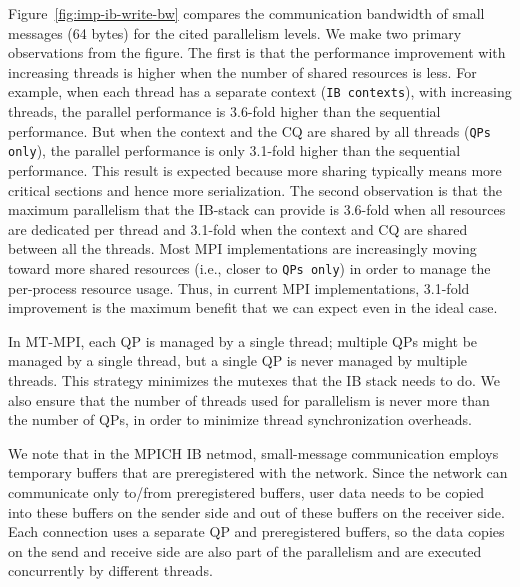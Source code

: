 Figure~\ref{fig:imp-ib-write-bw} compares the communication bandwidth
of small messages (64 bytes) for the cited parallelism levels.  We
make two primary observations from the figure.  The first is that the
performance improvement with increasing threads is higher when the
number of shared resources is less.  For example, when each thread has
a separate context (\texttt{IB contexts}), with increasing threads,
the parallel performance is 3.6-fold higher than the sequential
performance.  But when the context and the CQ are shared by all
threads (\texttt{QPs only}), the parallel performance is only 3.1-fold
higher than the sequential performance.  This result is expected
because more sharing typically means more critical sections and hence
more serialization.  The second observation is that the maximum
parallelism that the IB-stack can provide is 3.6-fold when all
resources are dedicated per thread and 3.1-fold when the context and
CQ are shared between all the threads.  Most MPI implementations are
increasingly moving toward more shared resources (i.e., closer to
\texttt{QPs only}) in order to manage the per-process resource usage.
Thus, in current MPI implementations, 3.1-fold improvement is the
maximum benefit that we can expect even in the ideal case.

In MT-MPI, each QP is managed by a single thread; multiple QPs might
be managed by a single thread, but a single QP is never managed by
multiple threads.  This strategy minimizes the mutexes that the IB
stack needs to do.  We also ensure that the number of threads used for
parallelism is never more than the number of QPs, in order to minimize
thread synchronization overheads.

We note that in the MPICH IB netmod, small-message communication
employs temporary buffers that are preregistered with the network.
Since the network can communicate only to/from preregistered buffers,
user data needs to be copied into these buffers on the sender side and
out of these buffers on the receiver side.  Each connection uses a
separate QP and preregistered buffers, so the data copies on the send
and receive side are also part of the parallelism and are executed
concurrently by different threads.


